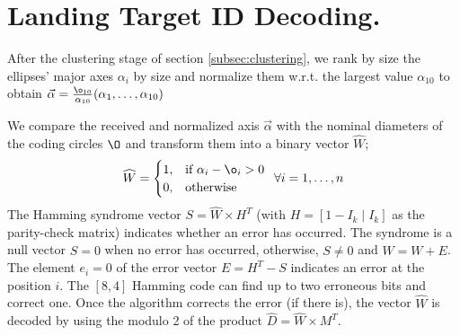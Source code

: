 \section{Landing Target ID Decoding.}
After the clustering stage of section \ref{subsec:clustering}, we rank by size the ellipses' major axes $\alpha_i$ by size and normalize them w.r.t. the largest value $\alpha_{10}$ to obtain %
$\vec{\alpha}=  \frac{\o_{10}}{\alpha_{10}} (\alpha_{1}, \ldots, \alpha_{10})$

We compare the received and normalized axis $\vec{\alpha}$ with the nominal diameters of the coding circles $\O$ and transform them into a binary vector $\widehat{W}$;
\begin{equation}
\widehat{W}=
\begin{cases}
  1, & \text{if } \alpha_{i}-\o_{i} > 0 \\
  0, & \text{otherwise}
\end{cases} \enspace \forall i=1,\ldots, n
\end{equation}
The Hamming syndrome vector $S=\widehat{W}\times H^{T}$ (with $H=[1-I_{k}\mid I_{k}]$ as the parity-check matrix) indicates whether an error has occurred. The syndrome is a null vector $S=0$ when no error has occurred, otherwise, $S\neq 0$ and $\widehat{W}=W+E$. The element $e_{i}=0$ of the error vector $E=H^{T}-S$ indicates an error at the position $i$. The $[8,4]$ Hamming code can find up to two erroneous bits and correct one. Once the algorithm corrects the error (if there is), the vector $\widehat{W}$ is decoded by using the modulo 2 of the product $\widehat{D}=\widehat{W}\times M^{T}$. 
